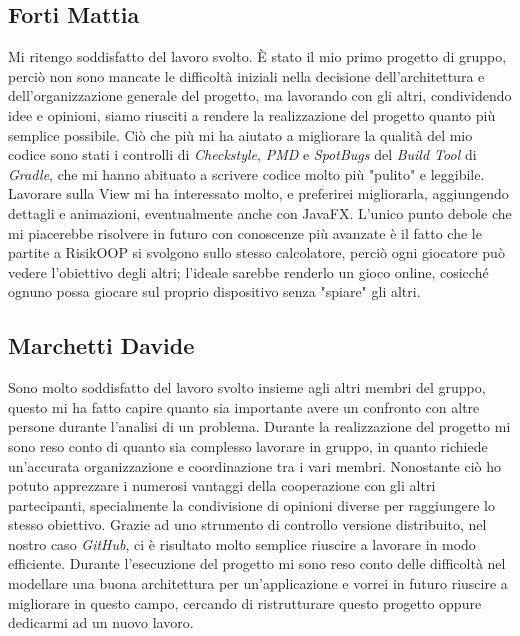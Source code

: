 \documentclass[a4paper,12pt]{report}
\begin{document}
\subsection*{Forti Mattia}
%
Mi ritengo soddisfatto del lavoro svolto. \`E stato il mio primo progetto di gruppo, perci\`o non sono mancate le difficolt\`a iniziali nella decisione dell'architettura e dell'organizzazione generale del progetto, ma lavorando con gli altri, condividendo idee e opinioni, siamo riusciti a rendere la realizzazione del progetto quanto pi\`u semplice possibile. Ci\`o che pi\`u mi ha aiutato a migliorare la qualit\`a del mio codice sono stati i controlli di \textit{Checkstyle}, \textit{PMD} e \textit{SpotBugs} del \textit{Build Tool} di \textit{Gradle}, che mi hanno abituato a scrivere codice molto pi\`u "pulito" e leggibile. Lavorare sulla View mi ha interessato molto, e preferirei migliorarla, aggiungendo dettagli e animazioni, eventualmente anche con JavaFX. L'unico punto debole che mi piacerebbe risolvere in futuro con conoscenze pi\`u avanzate \`e il fatto che le partite a RisikOOP si svolgono sullo stesso calcolatore, perci\`o ogni giocatore pu\`o vedere l'obiettivo degli altri; l'ideale sarebbe renderlo un gioco online, cosicch\'e ognuno possa giocare sul proprio dispositivo senza "spiare" gli altri.
%
\subsection*{Marchetti Davide}
%
Sono molto soddisfatto del lavoro svolto insieme agli altri membri del gruppo, questo mi ha fatto capire quanto sia importante avere un confronto con altre persone durante l'analisi di un problema. Durante la realizzazione del progetto mi sono reso conto di quanto sia complesso lavorare in gruppo, in quanto richiede un'accurata organizzazione e coordinazione tra i vari membri. Nonostante ci\`o ho potuto apprezzare i numerosi vantaggi della cooperazione con gli altri partecipanti, specialmente la condivisione di opinioni diverse per raggiungere lo stesso obiettivo. Grazie ad uno strumento di controllo versione distribuito, nel nostro caso \textit{GitHub}, ci \`e risultato molto semplice riuscire a lavorare in modo efficiente. Durante l'esecuzione del progetto mi sono reso conto delle difficolt\`a nel modellare una buona architettura per un'applicazione e vorrei in futuro riuscire a migliorare in questo campo, cercando di ristrutturare questo progetto oppure dedicarmi ad un nuovo lavoro.
%
\end{document}
